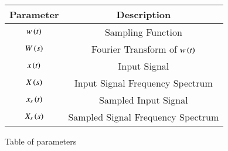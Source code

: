 \renewcommand\thetable{1}
\begin{tabular}{|c|c|}
    \hline 
    \textbf{Parameter}&\textbf{Description} \\
    \hline
    $w\left(t\right)$ & Sampling Function \\
    \hline
	$W\left(s\right)$ & Fourier Transform of $w\left(t\right)$ \\
    \hline
    $x\left(t\right)$ & Input Signal \\
    \hline
    $X\left(s\right)$ & Input Signal Frequency Spectrum \\
    \hline
    $x_s\left(t\right)$ & Sampled Input Signal \\
    \hline
    $X_s\left(s\right)$ & Sampled Signal Frequency Spectrum \\
    \hline
\end{tabular}

\caption{Table of parameters}
\label{Table:1}

